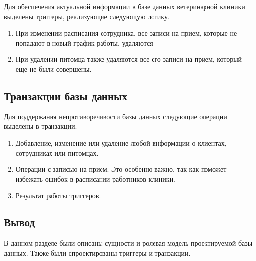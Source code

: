 Для обеспечения актуальной информации в базе данных ветеринарной клиники выделены триггеры, реализующие следующую логику.
\begin{enumerate}[label=\arabic*)]
	\item При изменении расписания сотрудника, все записи на прием, которые не попадают в новый график работы, удаляются. 
	\item При удалении питомца также удаляются все его записи на прием, который еще не были совершены.
\end{enumerate}

\subsection{Транзакции базы данных}
Для поддержания непротиворечивости базы данных следующие операции выделены в транзакции.

\begin{enumerate}[label=\arabic*)]
	\item Добавление, изменение или удаление любой информации о клиентах, сотрудниках или питомцах. 
	\item Операции с записью на прием. Это особенно важно, так как поможет избежать ошибок в расписании работников клиники.
	\item Результат работы триггеров. 
\end{enumerate}


\subsection*{Вывод}
В данном разделе были описаны сущности и ролевая модель проектируемой базы данных. Также были спроектированы триггеры и транзакции.